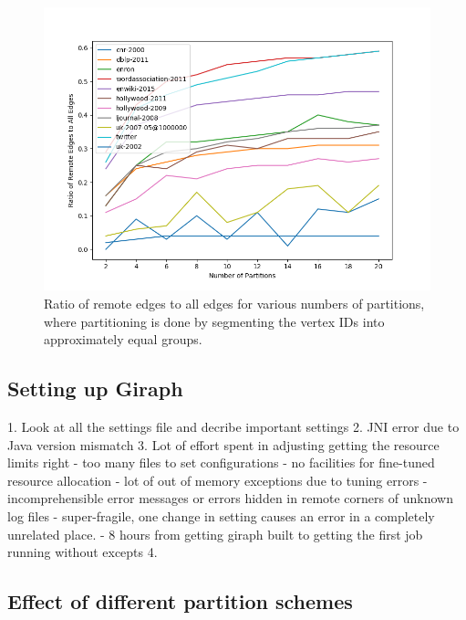 \begin{figure}
	\centering
	\includegraphics[width=\columnwidth]{../good_plots/remote_to_all_chunked.png}
	\caption{Ratio of remote edges to all edges for various numbers of 
	partitions, where partitioning is done by segmenting the vertex IDs into 
	approximately equal groups.}
	\label{fig:remote_to_all_range}
\end{figure}

\subsection{Setting up Giraph}
1. Look at all the settings file and decribe important settings 
2. JNI error due to Java version mismatch
3. Lot of effort spent in adjusting getting the resource limits right
    - too many files to set configurations
    - no facilities for fine-tuned resource allocation - lot of out of memory exceptions due to tuning errors
    - incomprehensible error messages or errors hidden in remote corners of unknown log files
    - super-fragile, one change in setting causes an error in a completely unrelated place.
    - 8 hours from getting giraph built to getting the first job running without excepts
4. 

\subsection{Effect of different partition schemes}
